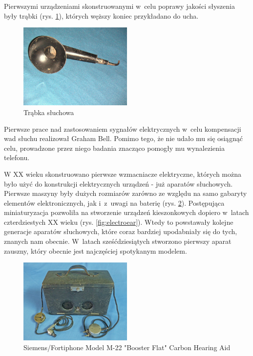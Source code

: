 \documentclass[journal,11pt]{IEEEtran}
\begin{document}
Pierwszymi urządzeniami skonstruowanymi w~celu poprawy jakości słyszenia były trąbki (rys. \ref{fig:trumpet}), których węższy koniec przykładano do ucha.

\begin{figure}
    \includegraphics[width=0.5\textwidth]{trumpet}
    \caption{Trąbka słuchowa}
    \label{fig:trumpet}
\end{figure}

Pierwsze prace nad zastosowaniem sygnałów elektrycznych w~celu kompensacji wad
słuchu realizował Graham Bell. Pomimo tego, że nie udało mu się osiągnąć celu,
prowadzone przez niego badania znacząco pomogły mu wynalezienia telefonu.

W XX wieku skonstruowano pierwsze wzmacniacze elektryczne, których można było
użyć do konstrukcji elektrycznych urządzeń - już aparatów słuchowych. Pierwsze
maszyny były dużych rozmiarów zarówno ze względu na samo gabaryty elementów
elektronicznych, jak i~z~uwagi na baterię (rys. \ref{fig:siemens-old}).
Postępująca miniaturyzacja pozwoliła na stworzenie urządzeń kieszonkowych
dopiero w~latach czterdziestych XX wieku (rys. \ref{fig:electroear}). Wtedy to
powstawały kolejne generacje aparatów słuchowych, które coraz bardziej
upodabniały się do tych, znanych nam obecnie. W~latach sześćdziesiątych
stworzono pierwszy aparat zauszny, który obecnie jest najczęściej spotykanym
modelem.

\begin{figure}
    \includegraphics[width=0.5\textwidth]{siemens_old}
    \caption{Siemens/Fortiphone Model M-22 "Booster Flat" Carbon Hearing Aid}
    \label{fig:siemens-old}
\end{figure}
\end{document}
